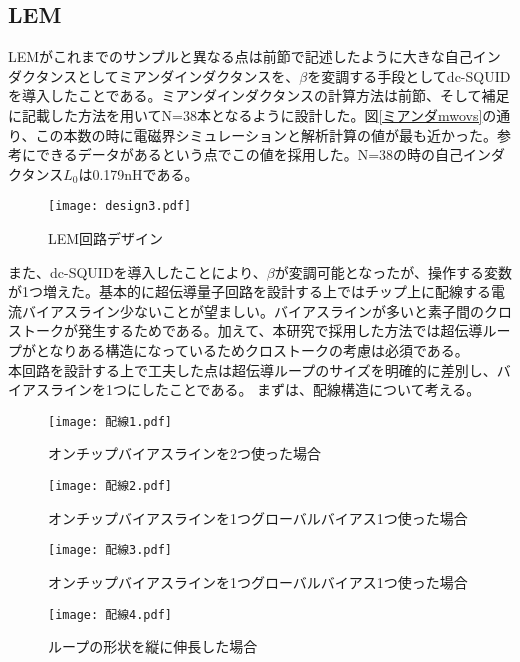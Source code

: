     \subsection{LEM}
    LEMがこれまでのサンプルと異なる点は前節で記述したように大きな自己インダクタンスとしてミアンダインダクタンスを、$\beta$を変調する手段としてdc-SQUIDを導入したことである。ミアンダインダクタンスの計算方法は前節、そして補足に記載した方法を用いてN=38本となるように設計した。図\ref*{ミアンダmwovs}の通り、この本数の時に電磁界シミュレーションと解析計算の値が最も近かった。参考にできるデータがあるという点でこの値を採用した。N=38の時の自己インダクタンス$L_0$は0.179nHである。\\

    \begin{figure}[H]
        \centering
        \texttt{[image: design3.pdf]}
        \caption{LEM回路デザイン}
        \label{LEM}
    \end{figure}
    また、dc-SQUIDを導入したことにより、$\beta$が変調可能となったが、操作する変数が1つ増えた。基本的に超伝導量子回路を設計する上ではチップ上に配線する電流バイアスライン少ないことが望ましい。バイアスラインが多いと素子間のクロストークが発生するためである。加えて、本研究で採用した方法では超伝導ループがとなりある構造になっているためクロストークの考慮は必須である。\\
    本回路を設計する上で工夫した点は超伝導ループのサイズを明確的に差別し、バイアスラインを1つにしたことである。
    まずは、配線構造について考える。
    \begin{figure}[H]
        \begin{minipage}[t]{0.5\columnwidth}
            \centering
            \texttt{[image: 配線1.pdf]}
            \caption{オンチップバイアスラインを2つ使った場合}
            \label{haisen1}
        \end{minipage}%
        \begin{minipage}[t]{0.5\columnwidth}
            \centering
            \texttt{[image: 配線2.pdf]}
            \caption{オンチップバイアスラインを1つグローバルバイアス1つ使った場合}
            \label{haisen2}
        \end{minipage}
    \end{figure}
    \begin{figure}[H]
        \begin{minipage}[t]{0.5\columnwidth}
            \centering
            \texttt{[image: 配線3.pdf]}
            \caption{オンチップバイアスラインを1つグローバルバイアス1つ使った場合}
            \label{haisen3}
        \end{minipage}%
        \begin{minipage}[t]{0.5\columnwidth}
            \centering
            \texttt{[image: 配線4.pdf]}
            \caption{ループの形状を縦に伸長した場合}
            \label{haisen4}
        \end{minipage}
    \end{figure}
